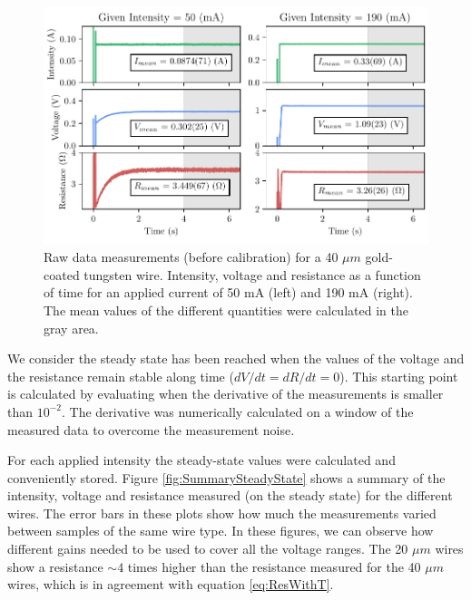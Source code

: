 \begin{figure}[h]
    \centering
    \includegraphics[width=1.0\columnwidth]{Figure_TransientExample1/TransientExample.pdf}
    \caption{Raw data measurements (before calibration) for a 40 $\mu m$ gold-coated tungsten wire. Intensity, voltage and resistance as a function of time for an applied current of 50 mA (left) and 190 mA (right). The mean values of the different quantities were calculated in the gray area. }
    \label{fig:RawMeasurements}
\end{figure}

We consider the steady state has been reached when the values of the voltage and the resistance remain stable along time ($dV/dt = dR/dt = 0 $).  This starting point is calculated by evaluating when the derivative of the measurements is smaller than $10^{-2}$. The derivative was numerically calculated on a window of the measured data to overcome the measurement noise.

For each applied intensity the steady-state values were calculated and conveniently stored. Figure \ref{fig:SummarySteadyState} shows a summary of the intensity, voltage and resistance measured (on the steady state) for the different wires. The error bars in these plots show how much the measurements varied between samples of the same wire type. In these figures, we can observe how different gains needed to be used to cover all the voltage ranges. The 20 $\mu m$ wires show a resistance $\sim 4$ times higher than the resistance measured for the 40 $\mu m$ wires, which is in agreement with equation \ref{eq:ResWithT}.

\newpage

